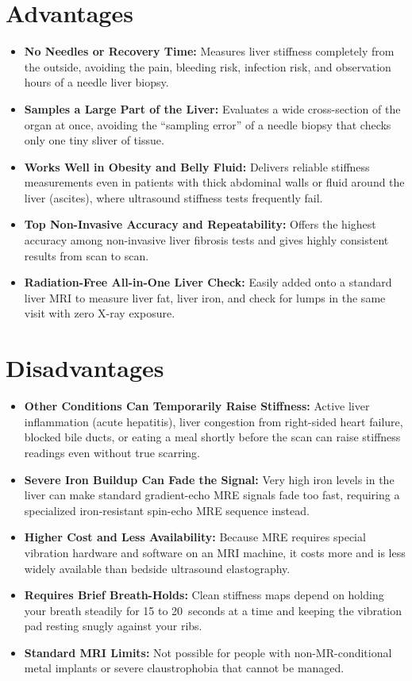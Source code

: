 \section{Advantages}
\begin{itemize}
\item \textbf{No Needles or Recovery Time:} Measures liver stiffness completely from the outside, avoiding the pain, bleeding risk, infection risk, and observation hours of a needle liver biopsy.
\item \textbf{Samples a Large Part of the Liver:} Evaluates a wide cross-section of the organ at once, avoiding the ``sampling error'' of a needle biopsy that checks only one tiny sliver of tissue.
\item \textbf{Works Well in Obesity and Belly Fluid:} Delivers reliable stiffness measurements even in patients with thick abdominal walls or fluid around the liver (ascites), where ultrasound stiffness tests frequently fail.
\item \textbf{Top Non-Invasive Accuracy and Repeatability:} Offers the highest accuracy among non-invasive liver fibrosis tests and gives highly consistent results from scan to scan.
\item \textbf{Radiation-Free All-in-One Liver Check:} Easily added onto a standard liver MRI to measure liver fat, liver iron, and check for lumps in the same visit with zero X-ray exposure.
\end{itemize}

\section{Disadvantages}
\begin{itemize}
\item \textbf{Other Conditions Can Temporarily Raise Stiffness:} Active liver inflammation (acute hepatitis), liver congestion from right-sided heart failure, blocked bile ducts, or eating a meal shortly before the scan can raise stiffness readings even without true scarring.
\item \textbf{Severe Iron Buildup Can Fade the Signal:} Very high iron levels in the liver can make standard gradient-echo MRE signals fade too fast, requiring a specialized iron-resistant spin-echo MRE sequence instead.
\item \textbf{Higher Cost and Less Availability:} Because MRE requires special vibration hardware and software on an MRI machine, it costs more and is less widely available than bedside ultrasound elastography.
\item \textbf{Requires Brief Breath-Holds:} Clean stiffness maps depend on holding your breath steadily for 15 to 20~seconds at a time and keeping the vibration pad resting snugly against your ribs.
\item \textbf{Standard MRI Limits:} Not possible for people with non-MR-conditional metal implants or severe claustrophobia that cannot be managed.
\end{itemize}

